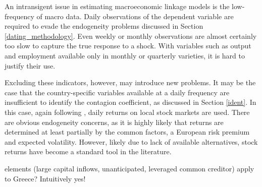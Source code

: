 \documentclass[/../base.tex]{subfiles}
\begin{document}
An intransigent issue in estimating macroeconomic linkage models is the low-frequency of macro data. Daily observations of the dependent variable are required to evade the endogeneity problems discussed in Section \ref{dating_methodology}. Even weekly or monthly observations are almost certainly too slow to capture the true response to a shock. With variables such as output and employment available only in monthly or quarterly varieties, it is hard to justify their use.

Excluding these indicators, however, may introduce new problems. It may be the case that the country-specific variables available at a daily frequency are insufficient to identify the contagion coefficient, as discussed in Section \ref{ident}. In this case, again following \cite{metiu2012sovereign}, daily returns on local stock markets are used. There are obvious endogeneity concerns, as it is highly likely that returns are determined at least partially by the common factors, a European risk premium and expected volatility. However, likely due to lack of available alternatives, stock returns have become a standard tool in the literature.


\cite{kaminsky2003unholy} elements (large capital inflows, unanticipated, leveraged common creditor) apply to Greece? Intuitively yes!
\end{document}
